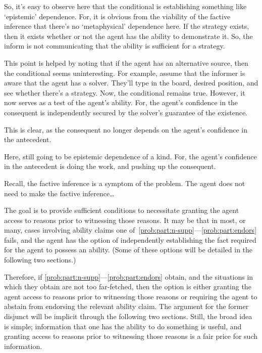 \documentclass[10pt]{article}
\begin{document}
\begin{note}
  So, it's easy to observe here that the conditional is establishing something like `epistemic' dependence.
  For, it is obvious from the viability of the factive inference that there's no `metaphysical' dependence here.
  If the strategy exists, then it exists whether or not the agent has the ability to demonstrate it.
  So, the inform is not communicating that the ability is sufficient for a strategy.

  This point is helped by noting that if the agent has an alternative source, then the conditional seems uninteresting.
  For example, assume that the informer is aware that the agent has a solver.
  They'll type in the board, desired position, and see whether there's a strategy.
  Now, the conditional remains true.
  However, it now serves as a test of the agent's ability.
  For, the agent's confidence in the consequent is independently secured by the solver's guarantee of the existence.
\end{note}

\begin{note}
  This is clear, as the consequent no longer depends on the agent's confidence in the antecedent.
\end{note}

\begin{note}
  Here, still going to be epistemic dependence of a kind.
  For, the agent's confidence in the antecedent is doing the work, and pushing up the consequent.
\end{note}

Recall, the factive inference is a symptom of the problem.
The agent does not need to make the factive inference\dots

The goal is to provide sufficient conditions to necessitate granting the agent access to reasons prior to witnessing those reasons.
It may be that in most, or many, cases involving ability claims one of~\ref{prob:part:n-supp}---\ref{prob:part:endors} fails, and the agent has the option of independently establishing the fact required for the agent to possess an ability.
(Some of these options will be detailed in the following two sections.)

Therefore, if \ref{prob:part:n-supp}---\ref{prob:part:endors} obtain, and the situations in which they obtain are not too far-fetched, then the option is either granting the agent access to reasons prior to witnessing those reasons or requiring the agent to abstain from endorsing the relevant ability claim.
The argument for the former disjunct will be implicit through the following two sections.
Still, the broad idea is simple; information that one has the ability to do something is useful, and granting access to reasons prior to witnessing those reasons is a fair price for such information.
\end{document}
